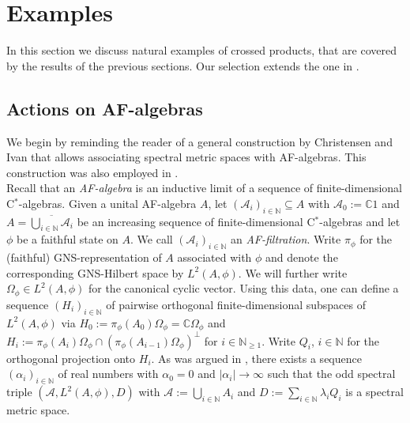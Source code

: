 \documentclass[a4paper,11pt,reqno]{amsart}
\numberwithin{equation}{section}
\numberwithin{equation}{section}
\theoremstyle{definition}
\theoremstyle{remark}
\theoremstyle{remark}
\begin{document}
\vspace{3mm}



\section{Examples}

\vspace{3mm}

In this section we discuss natural examples of crossed products, that are covered by the results
of the previous sections. Our selection extends the one in \cite{HSWZ13}. 

\vspace{3mm}


\subsection{Actions on AF-algebras}

We begin by reminding the reader of a general construction by Christensen
and Ivan \cite{CI06} that allows associating spectral metric spaces with AF-algebras. This construction
was also employed in \cite[Subsection 3.3]{HSWZ13}. \\

Recall that an \emph{AF-algebra} is an inductive limit of a sequence
of finite-dimensional C$^{\ast}$-algebras. Given a unital AF-algebra
$A$, let $(\mathcal{A}_{i})_{i\in\mathbb{N}}\subseteq A$ with $\mathcal{A}_{0}:=\mathbb{C}1$
and $A=\overline{\bigcup_{i\in\mathbb{N}}\mathcal{A}_{i}}$ be an
increasing sequence of finite-dimensional C$^{\ast}$-algebras and
let $\phi$ be a faithful state on $A$. We call $(\mathcal{A}_{i})_{i\in\mathbb{N}}$
an \emph{AF-filtration}. Write $\pi_{\phi}$ for the (faithful) GNS-representation
of $A$ associated with $\phi$ and denote the corresponding GNS-Hilbert
space by $L^{2}(A,\phi)$. We will further write $\Omega_{\phi}\in L^{2}(A,\phi)$
for the canonical cyclic vector. Using this data, one can define a
sequence $(H_{i})_{i\in\mathbb{N}}$ of pairwise orthogonal finite-dimensional
subspaces of $L^{2}(A,\phi)$ via $H_{0}:=\pi_{\phi}(A_{0})\Omega_{\phi}=\mathbb{C}\Omega_{\phi}$
and $H_{i}:=\pi_{\phi}(A_{i})\Omega_{\phi}\cap(\pi_{\phi}(A_{i-1})\Omega_{\phi})^{\perp}$
for $i\in\mathbb{N}_{\geq1}$. Write $Q_{i}$, $i\in\mathbb{N}$ for
the orthogonal projection onto $H_{i}$. As was argued in \cite[Theorem 2.1]{CI06},
there exists a sequence $(\alpha_{i})_{i\in\mathbb{N}}$ of real numbers
with $\alpha_{0}=0$ and $|\alpha_{i}|\rightarrow\infty$ such that
the odd spectral triple $(\mathcal{A},L^{2}(A,\phi),D)$ with $\mathcal{A}:=\bigcup_{i\in\mathbb{N}}A_{i}$
and $D:=\sum_{i\in\mathbb{N}}\lambda_{i}Q_{i}$ is a spectral metric space.
\end{document}
